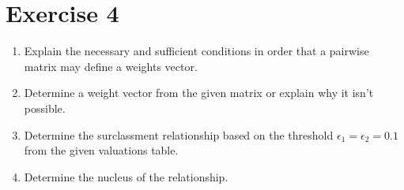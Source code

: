 \documentclass[\main/main.tex]{subfiles}
\begin{document}
\section{Exercise 4}


\begin{enumerate}
  \item Explain the necessary and sufficient conditions in order that a pairwise matrix may define a weights vector.
  \item Determine a weight vector from the given matrix or explain why it isn't possible.
  \item Determine the surclassment relationship based on the threshold $\epsilon_1=\epsilon_2=0.1$ from the given valuations table.
  \item Determine the nucleus of the relationship.
\end{enumerate}
\end{document}
